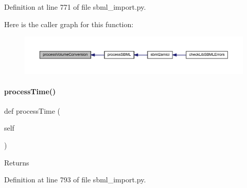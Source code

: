 Definition at line 771 of file sbml\+\_\+import.\+py.

Here is the caller graph for this function\+:
\nopagebreak
\begin{figure}[H]
\begin{center}
\leavevmode
\includegraphics[width=350pt]{classamici_1_1sbml__import_1_1_sbml_importer_af2a2cbf8550d30fc0e95a875758b8262_icgraph}
\end{center}
\end{figure}
\mbox{\label{classamici_1_1sbml__import_1_1_sbml_importer_a2819c6ad1b541e49e728aa172e57208e}} 
\paragraph{\texorpdfstring{process\+Time()}{processTime()}}
{\footnotesize\ttfamily def process\+Time (\begin{DoxyParamCaption}\item[{}]{self }\end{DoxyParamCaption})}

\begin{DoxyReturn}{Returns}

\end{DoxyReturn}


Definition at line 793 of file sbml\+\_\+import.\+py.

